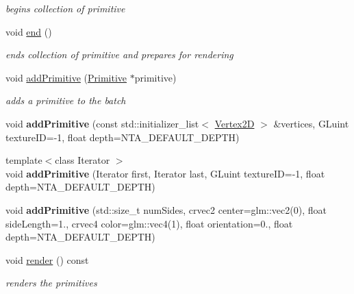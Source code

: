 \begin{DoxyCompactItemize}
\begin{DoxyCompactList}\small\item\em begins collection of primitive \end{DoxyCompactList}\item 
\mbox{\label{classnta_1_1PrimitiveBatch_a570927ae1e495ff444d44bd6d19c74ff}} 
void \hyperlink{classnta_1_1PrimitiveBatch_a570927ae1e495ff444d44bd6d19c74ff}{end} ()
\begin{DoxyCompactList}\small\item\em ends collection of primitive and prepares for rendering \end{DoxyCompactList}\item 
\mbox{\label{classnta_1_1PrimitiveBatch_a61a1fd06003233eac050ea7317fafc43}} 
void \hyperlink{classnta_1_1PrimitiveBatch_a61a1fd06003233eac050ea7317fafc43}{add\+Primitive} (\hyperlink{structnta_1_1Primitive}{Primitive} $\ast$primitive)
\begin{DoxyCompactList}\small\item\em adds a primitive to the batch \end{DoxyCompactList}\item 
\mbox{\label{classnta_1_1PrimitiveBatch_a3e27ba0adbccc7d83254ea1877025d05}} 
void {\bfseries add\+Primitive} (const std\+::initializer\+\_\+list$<$ \hyperlink{structnta_1_1Vertex2D}{Vertex2D} $>$ \&vertices, G\+Luint texture\+ID=-\/1, float depth=N\+T\+A\+\_\+\+D\+E\+F\+A\+U\+L\+T\+\_\+\+D\+E\+P\+TH)
\item 
\mbox{\label{classnta_1_1PrimitiveBatch_a632c197f0f3362d52ce8c0ff1e03745c}} 
{\footnotesize template$<$class Iterator $>$ }\\void {\bfseries add\+Primitive} (Iterator first, Iterator last, G\+Luint texture\+ID=-\/1, float depth=N\+T\+A\+\_\+\+D\+E\+F\+A\+U\+L\+T\+\_\+\+D\+E\+P\+TH)
\item 
\mbox{\label{classnta_1_1PrimitiveBatch_ac66007384a7932b1082c5d9baab8d836}} 
void {\bfseries add\+Primitive} (std\+::size\+\_\+t num\+Sides, crvec2 center=glm\+::vec2(0), float side\+Length=1., crvec4 color=glm\+::vec4(1), float orientation=0., float depth=N\+T\+A\+\_\+\+D\+E\+F\+A\+U\+L\+T\+\_\+\+D\+E\+P\+TH)
\item 
\mbox{\label{classnta_1_1PrimitiveBatch_a899411db2d7abc313d8bef4a19fd097e}} 
void \hyperlink{classnta_1_1PrimitiveBatch_a899411db2d7abc313d8bef4a19fd097e}{render} () const
\begin{DoxyCompactList}\small\item\em renders the primitives \end{DoxyCompactList}\end{DoxyCompactItemize}
